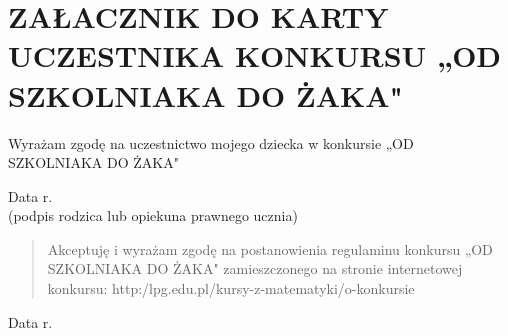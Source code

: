 \documentclass[10pt]{article}
\begin{document}
\section*{ZAŁACZNIK DO KARTY UCZESTNIKA KONKURSU „OD SZKOLNIAKA DO ŻAKA" }
Wyrażam zgodę na uczestnictwo mojego dziecka w konkursie „OD SZKOLNIAKA DO ŻAKA"

Data r.\\
(podpis rodzica lub opiekuna prawnego ucznia)

\begin{abstract}
Akceptuję i wyrażam zgodę na postanowienia regulaminu konkursu „OD SZKOLNIAKA DO ŻAKA" zamieszczonego na stronie internetowej konkursu: http:/lpg.edu.pl/kursy-z-matematyki/o-konkursie
\end{abstract}

Data r.
\end{document}
